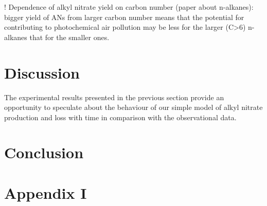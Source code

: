 \documentclass[11pt,a4paper]{article}
\begin{document}
! Dependence of alkyl nitrate yield on carbon number (paper about n-alkanes): bigger yield of ANs from larger carbon number means that the potential for contributing to photochemical air pollution may be less for the larger (C>6) n-alkanes that for the smaller ones.

\section{Discussion} \label{sec:discuss}
The experimental results presented in the previous section provide an opportunity to speculate about the behaviour of our simple model of alkyl nitrate production and loss with time in comparison with the observational data. 

\section{Conclusion} \label{sec:conclusion}


\section{Appendix I} \label{sec:appendix1}
\end{document}
